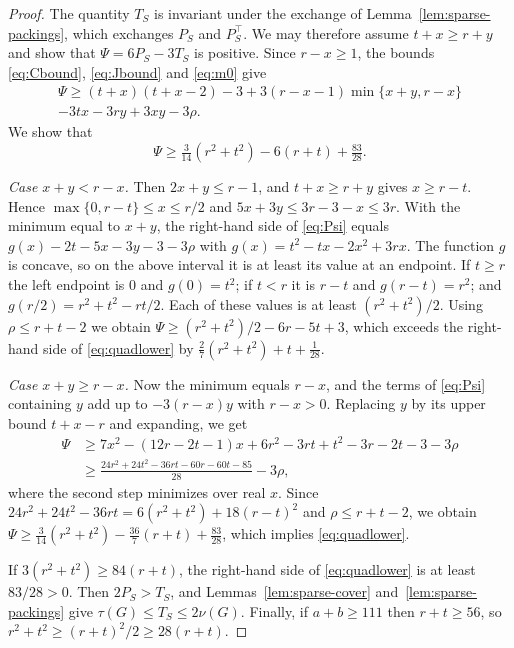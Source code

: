 \documentclass{amsart}
\theoremstyle{definition}
\numberwithin{equation}{section}
\numberwithin{table}{section}
\begin{document}
\begin{proof}
The quantity $T_S$ is invariant under the exchange of Lemma~\ref{lem:sparse-packings}, which exchanges $P_S$ and $P_S^{\top}$. We may therefore assume $t+x\ge r+y$ and show that $\Psi=6P_S-3T_S$ is positive. Since $r-x\ge 1$, the bounds \eqref{eq:Cbound}, \eqref{eq:Jbound} and \eqref{eq:m0} give
\begin{multline}\label{eq:Psi}
\Psi\ge (t+x)(t+x-2)-3+3(r-x-1)\min\{x+y,r-x\}\\
-3tx-3ry+3xy-3\rho .
\end{multline}
We show that
\begin{equation}\label{eq:quadlower}
\Psi\ge \tfrac{3}{14}(r^2+t^2)-6(r+t)+\tfrac{83}{28}.
\end{equation}

\emph{Case $x+y<r-x$.} Then $2x+y\le r-1$, and $t+x\ge r+y$ gives $x\ge r-t$. Hence $\max\{0,r-t\}\le x\le r/2$ and $5x+3y\le 3r-3-x\le 3r$. With the minimum equal to $x+y$, the right-hand side of \eqref{eq:Psi} equals $g(x)-2t-5x-3y-3-3\rho$ with $g(x)=t^2-tx-2x^2+3rx$. The function $g$ is concave, so on the above interval it is at least its value at an endpoint. If $t\ge r$ the left endpoint is $0$ and $g(0)=t^2$; if $t<r$ it is $r-t$ and $g(r-t)=r^2$; and $g(r/2)=r^2+t^2-rt/2$. Each of these values is at least $(r^2+t^2)/2$. Using $\rho\le r+t-2$ we obtain $\Psi\ge(r^2+t^2)/2-6r-5t+3$, which exceeds the right-hand side of \eqref{eq:quadlower} by $\frac27(r^2+t^2)+t+\frac1{28}$.

\emph{Case $x+y\ge r-x$.} Now the minimum equals $r-x$, and the terms of \eqref{eq:Psi} containing $y$ add up to $-3(r-x)y$ with $r-x>0$. Replacing $y$ by its upper bound $t+x-r$ and expanding, we get
\begin{align*}
\Psi&\ge 7x^2-(12r-2t-1)x+6r^2-3rt+t^2-3r-2t-3-3\rho\\
&\ge \frac{24r^2+24t^2-36rt-60r-60t-85}{28}-3\rho,
\end{align*}
where the second step minimizes over real $x$. Since $24r^2+24t^2-36rt=6(r^2+t^2)+18(r-t)^2$ and $\rho\le r+t-2$, we obtain $\Psi\ge\frac{3}{14}(r^2+t^2)-\frac{36}{7}(r+t)+\frac{83}{28}$, which implies \eqref{eq:quadlower}.

If $3(r^2+t^2)\ge 84(r+t)$, the right-hand side of \eqref{eq:quadlower} is at least $83/28>0$. Then $2P_S>T_S$, and Lemmas~\ref{lem:sparse-cover} and~\ref{lem:sparse-packings} give $\tau(G)\le T_S\le 2\nu(G)$. Finally, if $a+b\ge 111$ then $r+t\ge 56$, so $r^2+t^2\ge(r+t)^2/2\ge 28(r+t)$.
\end{proof}
\end{document}
